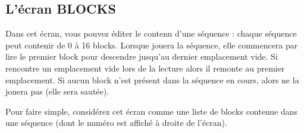 \documentclass[12pt,a4paper]{article}
\begin{document}
    \subsection{L'écran BLOCKS}

    Dans cet écran, vous pouvez éditer le contenu d'une séquence : chaque séquence peut contenir de 0 à 16 blocks.
    Lorsque \FAT jouera la séquence, elle commencera par lire le premier block pour descendre jusqu'au dernier emplacement vide.
    Si \FAT rencontre un emplacement vide lors de la lecture alors il remonte au premier emplacement.
    Si aucun block n'est présent dans la séquence en cours, alors \FAT ne la jouera pas (elle sera sautée).
    \medskip
    
    Pour faire simple, considérez cet écran comme une liste de blocks contenue dans une séquence (dont le numéro est affiché à droite de l'écran).
    
    
\end{document}
